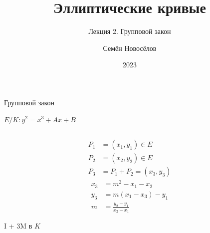 \documentclass{beamer}
\title{Эллиптические кривые}
\subtitle{Лекция 2. Групповой закон}
\author{Семён Новосёлов}
\institute{БФУ им. И. Канта}
\date{2023}
\begin{document}
	
	\frame{\titlepage}
	
	\begin{frame}{Групповой закон}%
		\begin{center}
			$E/K: y^2 = x^3 + Ax + B$
		\end{center}
		\begin{columns}
			\begin{column}{0.5\textwidth}
				\begin{equation*}
					\begin{split}
						P_1 &= (x_1, y_1) \in E \\
						P_2 &= (x_2, y_2) \in E \\
						P_3 &= P_1 + P_2 = \left(x_3, y_3\right)
					\end{split}
				\end{equation*}
				\begin{equation*}
					\begin{split}
						x_3 &= m^2 - x_1 - x_2 \\
						y_3 &= m\left( x_1 - x_3 \right) - y_1 \\
						m &= \frac{y_2 - y_1}{x_2 - x_1}
					\end{split}
				\end{equation*}
				\begin{center}
					\begin{tcolorbox}[enhanced,hbox,colback=box-blue-color!15,colframe=box-blue-color,title=Сложность,center title]
						\begin{varwidth}{\textwidth}
							\begin{center}
								I + $3$M в $K$
							\end{center}
						\end{varwidth}
					\end{tcolorbox}	
				\end{center}
				

\end{column}
\end{columns}
\end{frame}
\end{document}
